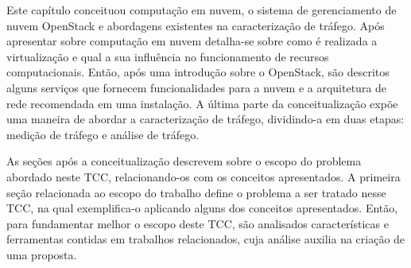 Este capítulo conceituou computação em nuvem, o sistema de gerenciamento de nuvem OpenStack e abordagens existentes na caracterização de tráfego.
%
Após apresentar sobre computação em nuvem detalha-se sobre como é realizada a virtualização e qual a sua influência no funcionamento de recursos computacionais.
%
Então, após uma introdução sobre o OpenStack, são descritos alguns serviços que fornecem funcionalidades para a nuvem e a arquitetura de rede recomendada em uma instalação.
%
A última parte da conceitualização expõe uma maneira de abordar a caracterização de tráfego, dividindo-a em duas etapas: medição de tráfego e análise de tráfego.

As seções após a conceitualização descrevem sobre o escopo do problema abordado neste TCC, relacionando-os com os conceitos apresentados.
%
A primeira seção relacionada ao escopo do trabalho define o problema a ser tratado nesse TCC, na qual exemplifica-o aplicando alguns dos conceitos apresentados.
%
Então, para fundamentar melhor o escopo deste TCC, são analisados características e ferramentas contidas em trabalhos relacionados, cuja análise auxilia na criação de uma proposta.
